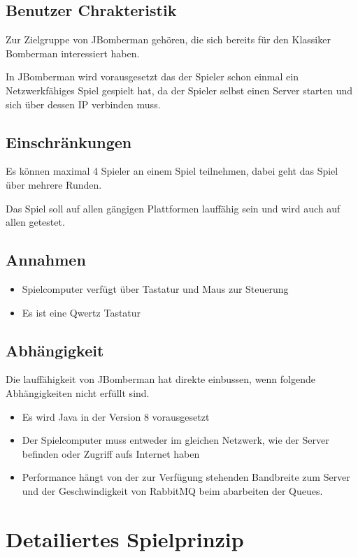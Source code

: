 \documentclass[11pt]{scrartcl}
\begin{document}
\subsection{Benutzer Chrakteristik}
\label{sec:Benutzer Chrakteristik}
Zur Zielgruppe von JBomberman gehören, die sich bereits für den Klassiker Bomberman interessiert haben.

In JBomberman wird vorausgesetzt das der Spieler schon einmal ein Netzwerkfähiges Spiel gespielt hat, da der Spieler selbst einen Server starten und sich über dessen IP verbinden muss.
\subsection{Einschränkungen}
\label{sec:Einschränkungen}
Es können maximal 4 Spieler an einem Spiel teilnehmen, dabei geht das Spiel über mehrere Runden.

Das Spiel soll auf allen gängigen Plattformen lauffähig sein und wird auch auf allen getestet.
\subsection{Annahmen}
\label{sec:Annahmen}
\begin{itemize}
    \item Spielcomputer verfügt über Tastatur und Maus zur Steuerung
    \item Es ist eine Qwertz Tastatur
\end{itemize}

\subsection{Abhängigkeit}
\label{sec:Abhängigkeit}
Die lauffähigkeit von JBomberman hat direkte einbussen, wenn folgende Abhängigkeiten nicht erfüllt sind.
\begin{itemize}
    \item Es wird Java in der Version 8 vorausgesetzt
    \item Der Spielcomputer muss entweder im gleichen Netzwerk, wie der Server befinden oder Zugriff aufs Internet haben
    \item Performance hängt von der zur Verfügung stehenden Bandbreite zum Server und der Geschwindigkeit von RabbitMQ beim abarbeiten der Queues.
\end{itemize}

\newpage
\section{Detailiertes Spielprinzip}
\label{sec:Detailiertes Spielprinzip}
\end{document}
